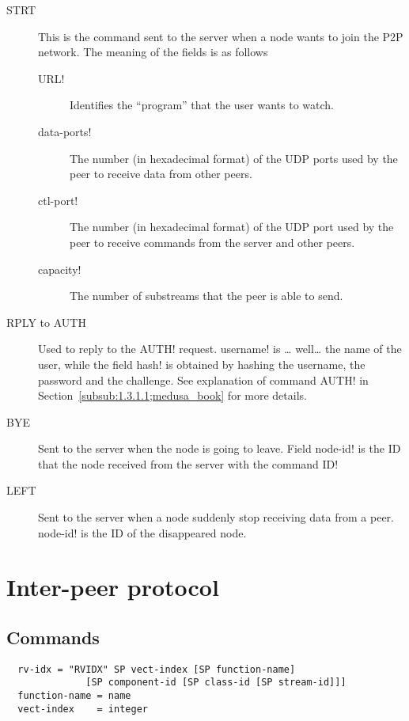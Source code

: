 \documentclass{medusabook}
\begin{document}
\begin{description}
  \item[STRT]  This is the command sent to the server when a node
  wants to join the P2P network.  The meaning of the fields is as
  follows
  \begin{description}
    \item[\ttt URL!] Identifies the ``program'' that the user wants
    to watch.
    \item[\ttt data-ports!] The number (in hexadecimal format) of the
    UDP ports used by the peer to receive data from other peers.
    \item[\ttt ctl-port!]
    The number (in hexadecimal format) of the
    UDP port used by the peer to receive commands from the server and
    other peers. 
    \item[\ttt capacity!] The number of substreams that the peer is
    able to send.
  \end{description}
  \item[RPLY to AUTH] Used to reply to the \ttt AUTH! request. \ttt
  username! is \ldots{} well\ldots{} the name of the user, while the
  field \ttt hash! is obtained by hashing the username, the password
  and the challenge.  See explanation of command \ttt AUTH!  in
  Section~\ref{subsub:1.3.1.1;medusa_book} for more details.
  \item[BYE] Sent to the server when the node is going to leave. Field
  \ttt node-id! is the ID that the node received from the server with
  the command \ttt ID! 
  \item[LEFT] Sent to the server when a node suddenly stop receiving
  data from a peer. \ttt node-id! is the ID of the disappeared node.
\end{description}

\section{Inter-peer protocol}
\label{sect:1.4;medusa_book}

\subsection{Commands}
\label{sub:1.4.1;medusa_book}

\begin{verbatim}
  rv-idx = "RVIDX" SP vect-index [SP function-name] 
              [SP component-id [SP class-id [SP stream-id]]]
  function-name = name
  vect-index    = integer
\end{verbatim}
\end{document}
